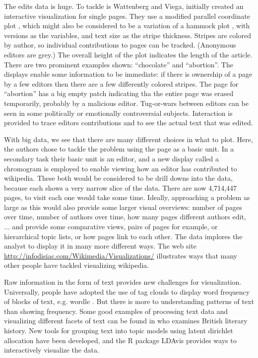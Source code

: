 \documentclass{article}
\begin{document}
The edits data is huge. To tackle is Wattenberg and Viega, initially created an interactive visualization for single pages. They use a modified parallel coordinate plot \citep{In85,We90}, which might also be considered to be a variation of a hammock plot \citep{hammock,ggparallel}, with versions as the variables, and text size as the stripe thickness. Stripes are colored by author, so individual contributions to pages can be tracked. (Anonymous editors are grey.) The overall height of the plot indicates the length of the article. There are two prominent examples shown: ``chocolate'' and ``abortion''. The displays enable some information to be immediate: if there is ownership of a page by a few editors then there are a few differently colored stripes. The page for ``abortion'' has a big empty patch indicating tha the entire page was erased temporarily, probably by a malicious editor. Tug-or-wars between editors can be seen in some politically or emotionally controversial subjects. Interaction is provided to trace editors contributions and to see the actual text that was edited.

With big data, we see that there are many different choices in what to plot. Here, the authors chose to tackle the problem using the page as a basic unit. In a secondary task their basic unit is an editor, and a new display called a chromogram {\color[rgb]{0,0,1} \citep{wattenberg2007visualizing}} is employed to enable viewing how an editor has contributed to wikipedia.  These both would be considered to be drill downs into the data, because each shows a very narrow slice of the data. There are now 4,714,447 pages, to visit each one would take some time. Ideally, approaching a problem as large as this would also provide some larger visual overviews: number of pages over time, number of authors over time, how many pages different authors edit, ... and provide some comparative views, pairs of pages for example, or hierarchical topic lists, or how pages link to each other. The data implores the analyst to display it in many more different ways. The web site \url{http://infodisiac.com/Wikimedia/Visualizations/} illustrates ways that many other people have tackled visualizing wikipedia.

Raw information in the form of text provides new challenges for visualization. Universally, people have adopted the use of tag clouds to display word frequency of blocks of text, e.g. wordle \citep{wordle}. But there is more to understanding patterns of text than showing frequency. Some good examples of processing text data and visualizing different facets of text can be found in \citet{jockers} who examines British literary history. New tools for grouping text into topic models using latent dirichlet allocation have been developed, and the R package LDAvis \citep{LDAvis} provides ways to interactively visualize the data.
\end{document}
